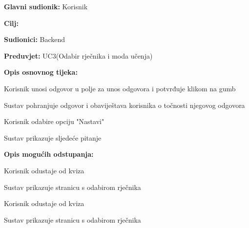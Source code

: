 					\noindent {}
					\begin{packed_item}
						
						\item \textbf{Glavni sudionik: } Korisnik
						\item  \textbf{Cilj:} 
						\item  \textbf{Sudionici:} Backend
						\item  \textbf{Preduvjet:} UC3(Odabir rječnika i moda učenja)
						\item  \textbf{Opis osnovnog tijeka:}
						
						\item[] \begin{packed_enum}
							
							\item Korisnik unosi odgovor u polje za unos odgovora i potvrđuje klikom na gumb
							\item Sustav pohranjuje odgovor i obaviještava korisnika o točnosti njegovog odgovora
							\item Korisnik odabire opciju "Nastavi"
							\item Sustav prikazuje sljedeće pitanje
						\end{packed_enum}
						
						\item  \textbf{Opis mogućih odstupanja:}
						
						\item[] \begin{packed_item}
							
							\item[3.a] Korisnik odustaje od kviza
							\item[] \begin{packed_enum}
								
								\item Sustav prikazuje stranicu s odabirom rječnika
								
							\end{packed_enum}
							
							\item[4.a] Korisnik odustaje od kviza 
							\item[] \begin{packed_enum}
								
								\item Sustav prikazuje stranicu s odabirom rječnika
								
							\end{packed_enum}
							
						\end{packed_item}
					\end{packed_item}
					
